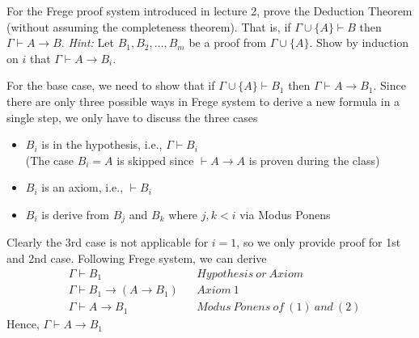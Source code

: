 \documentclass[11pt]{homework}
\begin{document}
\maketitle


\question
For the Frege proof system introduced in lecture 2, prove the Deduction Theorem
(without assuming the completeness theorem).
That is, if \(\Gamma \cup \{A\} \vdash B\) then \(\Gamma \vdash A \to B\).
\textit{Hint:} Let \(B_1, B_2,\dots, B_m\) be a proof from \(\Gamma \cup \{A\}\).
Show by induction on \(i\) that \(\Gamma \vdash A \to B_i\).

\begin{induction}
\basecase
For the base case, we need to show that if \(\Gamma \cup \{A\} \vdash B_1\) then \(\Gamma \vdash A \to B_1\).
Since there are only three possible ways in Frege system to derive a new formula in a single step, we only have to discuss the three cases
\begin{itemize}
  \item \(B_i\) is in the hypothesis, i.e., \(\Gamma \vdash B_i\) \\
        (The case \(B_i = A\) is skipped since \(\vdash A \to A\) is proven during the class)

  \item \(B_i\) is an axiom, i.e., \(\vdash B_i\)
  \item \(B_i\) is derive from \(B_j\) and \(B_k\) where \(j, k < i\) via
        Modus Ponens
\end{itemize}

Clearly the 3rd case is not applicable for \(i = 1\),
so we only provide proof for 1st and 2nd case.
Following Frege system, we can derive
\begin{align}
& \Gamma \vdash B_1                 && Hypothesis\ or\ Axiom\\
& \Gamma \vdash B_1 \to (A \to B_1) && Axiom\ 1  \\
& \Gamma \vdash A \to B_1           && Modus\ Ponens\ of\ (1) \ and\ (2)
\end{align}
\setcounter{equation}{0}
Hence, \(\Gamma \vdash A \to B_1\)


\end{induction}
\end{document}
